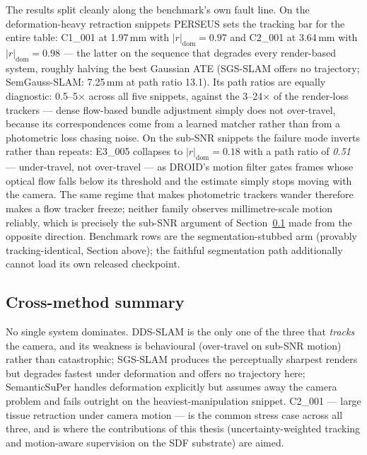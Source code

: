 The results split cleanly along the benchmark's own fault line. On the
deformation-heavy retraction snippets PERSEUS sets the tracking bar for the
entire table: C1\_001 at 1.97\,mm with $|r|_{\mathrm{dom}}=0.97$ and C2\_001
at 3.64\,mm with $|r|_{\mathrm{dom}}=0.98$ --- the latter on the sequence
that degrades every render-based system, roughly halving the best Gaussian
ATE (SGS-SLAM offers no trajectory; SemGauss-SLAM: 7.25\,mm at path ratio
13.1). Its path ratios are equally diagnostic: 0.5--5$\times$ across all five
snippets, against the 3--24$\times$ of the render-loss trackers --- dense
flow-based bundle adjustment simply does not over-travel, because its
correspondences come from a learned matcher rather than from a photometric
loss chasing noise. On the sub-SNR snippets the failure mode inverts rather
than repeats: E3\_005 collapses to $|r|_{\mathrm{dom}}=0.18$ with a path
ratio of \emph{0.51} --- under-travel, not over-travel --- as DROID's motion
filter gates frames whose optical flow falls below its threshold and the
estimate simply stops moving with the camera. The same regime that makes
photometric trackers wander therefore makes a flow tracker freeze; neither
family observes millimetre-scale motion reliably, which is precisely the
sub-SNR argument of Section~\ref{sec:bench_summary} made from the opposite
direction. Benchmark rows are the segmentation-stubbed arm (provably
tracking-identical, Section above); the faithful segmentation path
additionally cannot load its own released checkpoint.

\subsection{Cross-method summary}
\label{sec:bench_summary}

No single system dominates. DDS-SLAM is the only one of the three that
\emph{tracks} the camera, and its weakness is behavioural (over-travel on
sub-SNR motion) rather than catastrophic; SGS-SLAM produces the perceptually
sharpest renders but degrades fastest under deformation and offers no
trajectory here; SemanticSuPer handles deformation explicitly but assumes away
the camera problem and fails outright on the heaviest-manipulation snippet.
C2\_001 --- large tissue retraction under camera motion --- is the common
stress case across all three, and is where the contributions of this thesis
(uncertainty-weighted tracking and motion-aware supervision on the SDF
substrate) are aimed.
